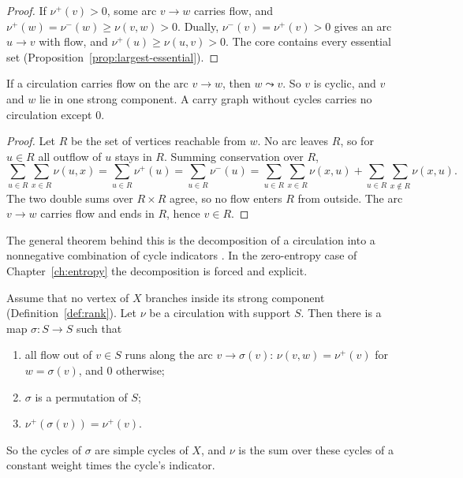 \begin{proof}
If \(\nu^+(v)>0\), some arc \(v\to w\) carries flow, and \(\nu^+(w)=\nu^-(w)\ge\nu(v,w)>0\).
Dually, \(\nu^-(v)=\nu^+(v)>0\) gives an arc \(u\to v\) with flow, and \(\nu^+(u)\ge\nu(u,v)>0\).
The core contains every essential set (Proposition~\ref{prop:largest-essential}).
\end{proof}

\begin{theorem}\label{thm:flow-cycles}
If a circulation carries flow on the arc \(v\to w\), then \(w\leadsto v\). So \(v\) is cyclic,
and \(v\) and \(w\) lie in one strong component. A carry graph without cycles carries no
circulation except \(0\).
\end{theorem}

\begin{proof}
Let \(R\) be the set of vertices reachable from \(w\). No arc leaves \(R\), so for \(u\in R\)
all outflow of \(u\) stays in \(R\). Summing conservation over \(R\),
\[
  \sum_{u\in R}\sum_{x\in R}\nu(u,x)=\sum_{u\in R}\nu^+(u)=\sum_{u\in R}\nu^-(u)
  =\sum_{u\in R}\sum_{x\in R}\nu(x,u)+\sum_{u\in R}\sum_{x\notin R}\nu(x,u).
\]
The two double sums over \(R\times R\) agree, so no flow enters \(R\) from outside. The arc
\(v\to w\) carries flow and ends in \(R\), hence \(v\in R\).
\end{proof}

The general theorem behind this is the decomposition of a circulation into a nonnegative
combination of cycle indicators \cite[ch.~3]{BJG09}. In the zero-entropy case of
Chapter~\ref{ch:entropy} the decomposition is forced and explicit.

\begin{theorem}\label{thm:flow-zero-entropy}
Assume that no vertex of \(X\) branches inside its strong component
(Definition~\ref{def:rank}). Let \(\nu\) be a circulation with support \(S\). Then there is a
map \(\sigma\colon S\to S\) such that
\begin{enumerate}[label=(\alph*)]
\item all flow out of \(v\in S\) runs along the arc \(v\to\sigma(v)\):
  \(\nu(v,w)=\nu^+(v)\) for \(w=\sigma(v)\), and \(0\) otherwise;
\item \(\sigma\) is a permutation of \(S\);
\item \(\nu^+(\sigma(v))=\nu^+(v)\).
\end{enumerate}
So the cycles of \(\sigma\) are simple cycles of \(X\), and \(\nu\) is the sum over these cycles of
a constant weight times the cycle's indicator.
\end{theorem}

